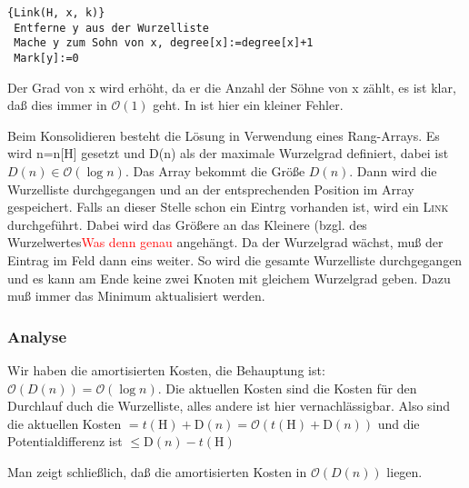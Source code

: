 \documentclass[ngerman,draft,parskip=half*,twoside]{scrreprt}
\theoremstyle{break}
\theoremstyle{nonumberbreak}
\newcommand*{\OO}{\mathcal{O}}      %
\begin{document}
\begin{Algorithmus}[H]
\begin{lstlisting}[frame=tlrb, mathescape=true, title=\textsc{Link\textnormal{(H, x, k)}}, gobble=1]{Link(H, x, k)}
 Entferne y aus der Wurzelliste
 Mache y zum Sohn von x, degree[x]:=degree[x]+1
 Mark[y]:=0
\end{lstlisting}
Der Grad von x wird erhöht, da er die Anzahl der Söhne von x zählt, es ist klar, daß dies immer in $\OO(1)$ geht. In
\cite{ottmann} ist hier ein kleiner Fehler.
\end{Algorithmus}

Beim Konsolidieren besteht die Lösung in Verwendung eines Rang-Arrays.
Es wird n=n[H] gesetzt und D(n) als der maximale Wurzelgrad definiert, dabei ist $D(n)\in\OO(\log n)$. Das Array bekommt 
die Größe $D(n)$. Dann wird die Wurzelliste durchgegangen und an der entsprechenden Position im Array gespeichert. Falls
an dieser Stelle schon ein Eintrg vorhanden ist, wird ein \textsc{Link} durchgeführt. Dabei wird das Größere an das
Kleinere (bzgl. des Wurzelwertes\textcolor{red}{Was denn genau} angehängt. Da der Wurzelgrad wächst, muß der Eintrag
im Feld dann eins weiter. So wird die gesamte Wurzelliste durchgegangen und es kann am Ende keine zwei Knoten mit
gleichem Wurzelgrad geben. Dazu muß immer das Minimum aktualisiert werden.

\subsubsection{Analyse}
Wir haben die amortisierten Kosten, die Behauptung ist: $\OO(D(n))=\OO(\log n)$. Die aktuellen Kosten sind die Kosten für den
Durchlauf duch die Wurzelliste, alles andere ist hier vernachlässigbar. Also sind die aktuellen Kosten
$=t(\mbox{H})+\mbox{D}(n)=\OO(t(\mbox{H})+\mbox{D}(n))$ und die Potentialdifferenz ist $\leq
\mbox{D}(n)-t(\mbox{H})$

Man zeigt schließlich, daß die amortisierten Kosten in $\OO(D(n))$ liegen.
\end{document}
